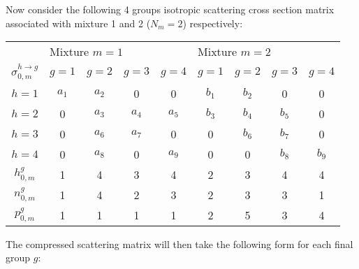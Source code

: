 Now consider the following 4 groups isotropic scattering cross
section matrix associated with mixture 1 and 2 ($N_{m}=2$) respectively:

\begin{center}
\begin{tabular}{c||cccc|cccc}
                        &\multicolumn{4}{l|}{Mixture $m=1$}     &
                         \multicolumn{4}{l}{Mixture $m=2$}      \\
$\sigma_{0,m}^{h\to g}$ &$g=1$   & $g=2$   & $g=3$   & $g=4$    &    
                         $g=1$   & $g=2$   & $g=3$   & $g=4$    \\ \hline\hline
$h=1$                  & $a_{1}$ & $a_{2}$ & 0       & 0        &
                         $b_{1}$ & $b_{2}$ & 0       & 0        \\
$h=2$                  & 0       & $a_{3}$ & $a_{4}$ & $a_{5}$  &
                         $b_{3}$ & $b_{4}$ & $b_{5}$ & 0        \\
$h=3$                  & 0       & $a_{6}$ & $a_{7}$ & 0        &
                         0       & $b_{6}$ & $b_{7}$ & 0        \\
$h=4$                  & 0       & $a_{8}$ & 0       & $a_{9}$  &
                         0       & 0       & $b_{8}$ & $b_{9}$  \\ \hline\hline
$h_{0,m}^{g}$          & 1       & 4       & 3       & 4        &
                         2       & 3       & 4       & 4        \\
$n_{0,m}^{g}$          & 1       & 4       & 2       & 3        &
                         2       & 3       & 3       & 1        \\
$p_{0,m}^{g}$          & 1       & 1       & 1       & 1        &
                         2       & 5       & 3       & 4        \\
\end{tabular}
\end{center}

\noindent
The compressed scattering matrix will then take the following form for each final group $g$:

